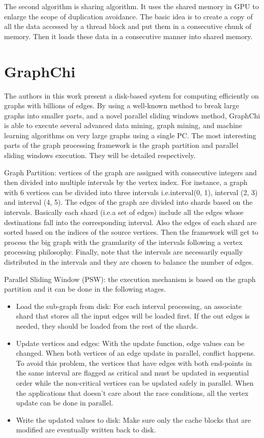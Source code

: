 The second algorithm is sharing algorithm. It uses the shared memory in GPU to
enlarge the scope of duplication avoidance. The basic idea is to create a copy
of all the data accessed by a thread block and put them in a consecutive chunk
of memory. Then it loads these data in a consecutive manner into shared memory.

\section{GraphChi}
The authors in this work \cite{kyrola2012graphchi} present a disk-based system for computing efficiently
on graphs with billions of edges. By using a well-known method to break large
graphs into smaller parts, and a novel parallel sliding windows method, GraphChi
is able to execute several advanced data mining, graph mining, and machine
learning algorithms on very large graphs using a single PC.
The most interesting parts of the graph processing framework is the graph
partition and parallel sliding windows execution. They will be detailed
respectively. 

Graph Partition: vertices of the graph are assigned with consecutive integers
and then divided into multiple intervals by the vertex index. For instance, a
graph with 6 vertices can be divided into three intervals i.e.interval(0, 1),
interval (2, 3) and interval (4, 5). The edges of the graph are divided
into shards based on the intervals. Basically each shard (i.e.a set of edges)
include all the edges whose destinations fall into the corresponding interval. 
Also the edges of each shard are sorted based on the indices of the source
vertices. Then the framework will get to process the big graph with the granularity of the
intervals following a vertex processing philosophy. Finally, note that the
intervals are necessarily equally distributed in the intervals and they are
chosen to balance the number of edges.

Parallel Sliding Window (PSW): the execution mechanism is based on the graph
partition and it can be done in the following stages. 
\begin{itemize}
    \item Load the sub-graph from disk: For each interval processing, an
        associate shard that stores all the input edges will be loaded first. If
        the out edges is needed, they should be loaded from the rest of the
        shards.
    \item Update vertices and edges: With the update function, edge values can
        be changed. When both vertices of an edge update in parallel, conflict
        happens. To avoid this problem, the vertices that have edges with both
        end-points in the same interval are flagged as critical and must be
        updated in sequential order while the non-critical vertices can be
        updated safely in parallel. When the applications that doesn't care
        about the race conditions, all the vertex update can be done in
        parallel. 
    \item Write the updated values to disk: Make sure only the cache blocks that are
        modified are eventually written back to disk.
\end{itemize}

